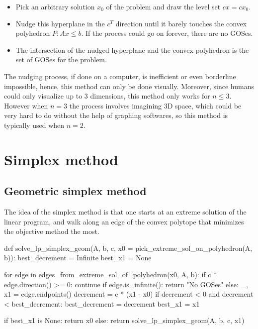 \begin{itemize}
\item Pick an arbitrary solution \( x_{0} \) of the problem and draw the level
  set \( cx = cx_{0} \).
\item Nudge this hyperplane in the \( c^{T} \) direction 
  until it barely touches the convex polyhedron \( P:
  Ax \le b\). If the process could go on forever, there are no GOSes.
\item The intersection of the nudged hyperplane and the convex polyhedron is the
  set of GOSes for the problem.
\end{itemize}

The nudging process, if done on a computer, is inefficient or even borderline
impossible, hence, this method can only be done visually. Moreover, since humans
could only visualize up to 3 dimensions, this method only works for \( n \le 3
\). However when \( n = 3 \) the process involves imagining 3D space, which could
be very hard to do without the help of graphing softwares, so this method is
typically used when \( n = 2 \).


\section{Simplex method} %
\label{sec:Simplex method}

\subsection{Geometric simplex method} %
\label{sub:Geometric simplex method}

The idea of the simplex method is that one starts at an extreme solution of the
linear program, and walk along an edge of the convex polytope that minimizes the
objective method the most.

\begin{python}
def solve_lp_simplex_geom(A, b, c, x0 = pick_extreme_sol_on_polyhedron(A, b)):
  best_decrement = Infinite
  best_x1 = None
 
  for edge in edges_from_extreme_sol_of_polyhedron(x0, A, b):
    if c * edge.direction() >= 0:
      continue
    if edge.is_infinite():
      return "No GOSes"
    else:
      _, x1 = edge.endpoints()
      decrement = c * (x1 - x0)
      if decrement < 0 and decrement < best_decrement:
        best_decrement = decrement
        best_x1 = x1
  
  if best_x1 is None:
    return x0
  else:
    return solve_lp_simplex_geom(A, b, c, x1)
\end{python}

